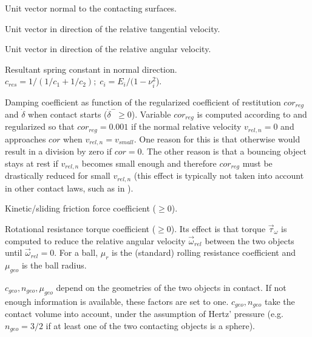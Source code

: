 \begin{description}[labelwidth=3ex]
\item[$\vec{e}_n$] Unit vector normal to the contacting surfaces.
\item[$\vec{e}_t$] Unit vector in direction of the relative tangential velocity.
\item[$\vec{e}_{\omega}$] Unit vector in direction of the relative angular velocity.
\item[$c_{res}(E_1, E_2, \nu_1, \nu_2)$]  Resultant spring constant in normal direction.
                   $c_{res}=1/(1/c_1+1/c_2); \; c_i=E_i/(1 - \nu_i^2$). 

\item[$d(cor_{reg}, \dot{\delta}^{-})$] Damping coefficient as function of the regularized
                   coefficient of restitution $cor_{reg}$ and $\dot{\delta}$
                   when contact starts ($\dot{\delta}^{-} \ge 0$).
                   Variable $cor_{reg}$ is computed according to \cite{Flores2011} and regularized
                   so that $cor_{reg} = 0.001$ if the normal relative velocity $v_{rel,n}=0$
                   and approaches $cor$ when $v_{rel,n} = v_{small}$.
                   One reason for this is
                   that otherwise \cite{Flores2011} would result in a division by zero if 
                    $cor =  0$. The other reason is that a bouncing object stays at rest if 
                   $v_{rel,n}$ becomes small enough and therefore $cor_{reg}$ must be drastically
                   reduced for small $v_{rel,n}$ (this effect is typically not taken
                   into account in other contact laws, such as in \cite{Skinjar2018}).
\item[$\mu_k$]     Kinetic/sliding friction force coefficient ($\ge 0$).
\item[$\mu_r$]     Rotational resistance torque coefficient ($\ge 0$). 
                   Its effect is that torque $\vec{\tau}_{\omega}$ is computed to reduce the relative
                   angular velocity $\vec{\omega}_{rel}$ between the two objects until $\vec{\omega}_{rel}=0$.
                   For a ball, $\mu_r$ is the (standard) rolling resistance coefficient and
                   $\mu_{geo}$ is the ball radius.
\end{description}
%
$c_{geo}, n_{geo}, \mu_{geo}$ depend on the geometries of the two objects in contact.
If not enough information is available, these factors are set to one.
$c_{geo}, n_{geo}$ take the contact volume into account, under the assumption of Hertz' pressure (e.g.\ $n_{geo} = 3/2$ if at least one of the
two contacting objects is a sphere).

